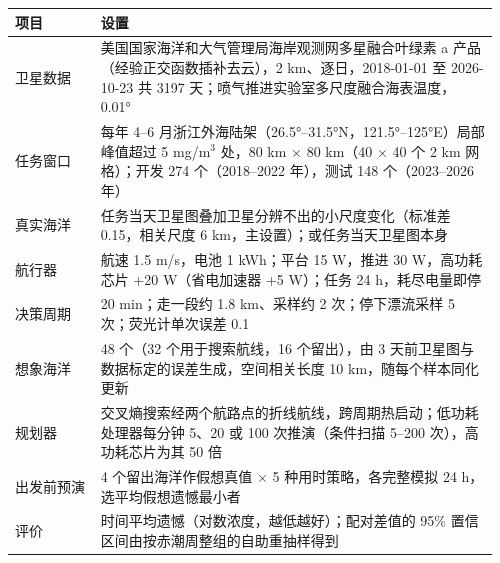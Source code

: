 \begin{tabular}{@{}p{0.17\linewidth}p{0.79\linewidth}@{}}
\toprule
项目 & 设置 \\
\midrule
卫星数据 & 美国国家海洋和大气管理局海岸观测网多星融合叶绿素 a 产品（经验正交函数插补去云），2 km、逐日，2018-01-01 至 2026-10-23 共 3197 天；喷气推进实验室多尺度融合海表温度，0.01° \\
任务窗口 & 每年 4--6 月浙江外海陆架（26.5°--31.5°N，121.5°--125°E）局部峰值超过 5 mg/m$^3$ 处，80 km $\times$ 80 km（40 $\times$ 40 个 2 km 网格）；开发 274 个（2018--2022 年），测试 148 个（2023--2026 年） \\
真实海洋 & 任务当天卫星图叠加卫星分辨不出的小尺度变化（标准差 0.15，相关尺度 6 km，主设置）；或任务当天卫星图本身 \\
航行器 & 航速 1.5 m/s，电池 1 kWh；平台 15 W，推进 30 W，高功耗芯片 +20 W（省电加速器 +5 W）；任务 24 h，耗尽电量即停 \\
决策周期 & 20 min；走一段约 1.8 km、采样约 2 次；停下漂流采样 5 次；荧光计单次误差 0.1 \\
想象海洋 & 48 个（32 个用于搜索航线，16 个留出），由 3 天前卫星图与数据标定的误差生成，空间相关长度 10 km，随每个样本同化更新 \\
规划器 & 交叉熵搜索经两个航路点的折线航线，跨周期热启动；低功耗处理器每分钟 5、20 或 100 次推演（条件扫描 5--200 次），高功耗芯片为其 50 倍 \\
出发前预演 & 4 个留出海洋作假想真值 $\times$ 5 种用时策略，各完整模拟 24 h，选平均假想遗憾最小者 \\
评价 & 时间平均遗憾（对数浓度，越低越好）；配对差值的 95\% 置信区间由按赤潮周整组的自助重抽样得到 \\
\bottomrule
\end{tabular}
